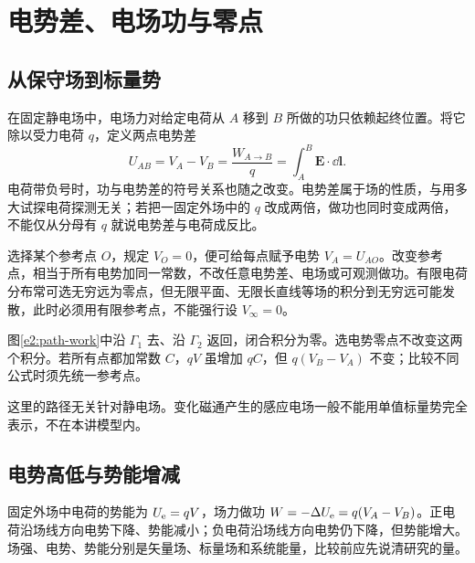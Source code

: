 \section{电势差、电场功与零点}
\subsection{从保守场到标量势}

在固定静电场中，电场力对给定电荷从 $A$ 移到 $B$ 所做的功只依赖起终位置。将它除以受力电荷 $q$，定义两点电势差
\[
 U_{AB}=V_A-V_B=\frac{W_{A\to B}}q
 =\int_A^B\bm E\cdot\dd\bm l.
\]
电荷带负号时，功与电势差的符号关系也随之改变。电势差属于场的性质，与用多大试探电荷探测无关；若把一固定外场中的 $q$ 改成两倍，做功也同时变成两倍，不能仅从分母有 $q$ 就说电势差与电荷成反比。

选择某个参考点 $O$，规定 $V_O=0$，便可给每点赋予电势 $V_A=U_{AO}$。改变参考点，相当于所有电势加同一常数，不改任意电势差、电场或可观测做功。有限电荷分布常可选无穷远为零点，但无限平面、无限长直线等场的积分到无穷远可能发散，此时必须用有限参考点，不能强行设 $V_\infty=0$。


图\ref{e2:path-work}中沿 $\Gamma_1$ 去、沿 $\Gamma_2$ 返回，闭合积分为零。选电势零点不改变这两个积分。若所有点都加常数 $C$，$qV$ 虽增加 $qC$，但 $q(V_B-V_A)$ 不变；比较不同公式时须先统一参考点。

这里的路径无关针对静电场。变化磁通产生的感应电场一般不能用单值标量势完全表示，不在本讲模型内。

\subsection{电势高低与势能增减}

固定外场中电荷的势能为 $U_{\rm e}=qV$，场力做功 $W=-\Delta U_{\rm e}=q(V_A-V_B)$。正电荷沿场线方向电势下降、势能减小；负电荷沿场线方向电势仍下降，但势能增大。场强、电势、势能分别是矢量场、标量场和系统能量，比较前应先说清研究的量。

